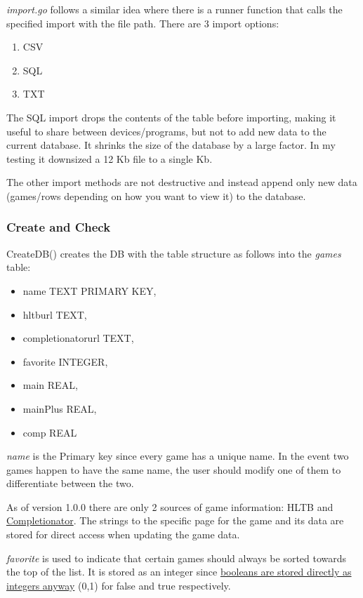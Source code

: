 \textit{import.go} follows a similar idea where there is a runner function
that calls the specified import with the file path.
There are 3 import options:
\begin{enumerate}
	\item CSV
	\item SQL
	\item TXT
\end{enumerate}

The SQL import drops the contents of the table before importing, making
it useful to share between devices/programs, but not to add new data
to the current database. It shrinks the size of the database by a
large factor. In my testing it downsized a 12 Kb file to
a single Kb.

The other import methods are not destructive and instead append only
new data (games/rows depending on how you want to view it) to the database.

\subsubsection{Create and Check}

CreateDB() creates the DB with the table structure as follows into
the \textit{games} table:
\begin{itemize}
	\item name TEXT PRIMARY KEY,
	\item hltburl TEXT,
	\item completionatorurl TEXT,
	\item favorite INTEGER,
	\item main REAL,
	\item mainPlus REAL,
	\item comp REAL
\end{itemize}

\textit{name} is the Primary key since every game has a unique name. In the
event two games happen to have the same name, the user should modify one
of them to differentiate between the two.

As of version 1.0.0 there are only 2 sources of game information:
HLTB and \href{https://completionator.com/}{Completionator}.
The strings to the specific page for the game and its data are stored
for direct access when updating the game data.

\textit{favorite} is used to indicate that certain games should
always be sorted towards the top of the list. It is stored as an
integer since \href{https://www.sqlite.org/datatype3.html}{booleans
are stored directly as integers anyway} (0,1) for false and true respectively.

